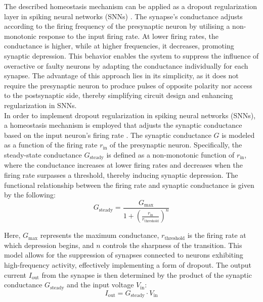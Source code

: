 \noindent The described homeostasis mechanism can be applied as a dropout regularization layer in spiking neural networks (SNNs) \cite{stoffel2024spiking}. The synapse's conductance adjusts according to the firing frequency of the presynaptic neuron by utilising a non-monotonic response to the input firing rate. At lower firing rates, the conductance is higher, while at higher frequencies, it decreases, promoting synaptic depression. This behavior enables the system to suppress the influence of overactive or faulty neurons by adapting the conductance individually for each synapse. The advantage of this approach lies in its simplicity, as it does not require the presynaptic neuron to produce pulses of opposite polarity nor access to the postsynaptic side, thereby simplifying circuit design and enhancing regularization in SNNs. \\

\noindent In order to implement dropout regularization in spiking neural networks (SNNs), a homeostasis mechanism is employed that adjusts the synaptic conductance based on the input neuron’s firing rate \cite{kim2021spiking}. The synaptic conductance \( G \) is modeled as a function of the firing rate \( r_{\text{in}} \) of the presynaptic neuron. Specifically, the steady-state conductance \( G_{\text{steady}} \) is defined as a non-monotonic function of \( r_{\text{in}} \), where the conductance increases at lower firing rates and decreases when the firing rate surpasses a threshold, thereby inducing synaptic depression. The functional relationship between the firing rate and synaptic conductance is given by the following:
\begin{equation}
G_{\text{steady}} = \frac{G_{\text{max}}}{1 + \left(\frac{r_{\text{in}}}{r_{\text{threshold}}}\right)^n} \label{eq:7.1}
\end{equation}


\noindent Here, \( G_{\text{max}} \) represents the maximum conductance, \( r_{\text{threshold}} \) is the firing rate at which depression begins, and \( n \) controls the sharpness of the transition. This model allows for the suppression of synapses connected to neurons exhibiting high-frequency activity, effectively implementing a form of dropout. The output current \( I_{\text{out}} \) from the synapse is then determined by the product of the synaptic conductance \( G_{\text{steady}} \) and the input voltage \( V_{\text{in}} \):
\begin{equation}
I_{\text{out}} = G_{\text{steady}} \cdot V_{\text{in}} \label{eq:7.2}
\end{equation}

